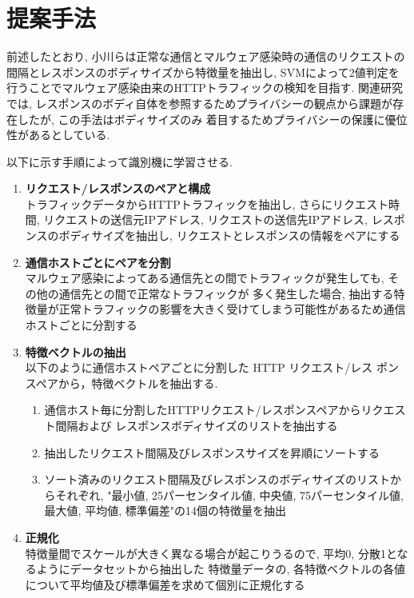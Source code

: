 \documentclass[twocolumn,10pt]{ltjsarticle}
\begin{document}
\section{提案手法}
前述したとおり, 小川らは正常な通信とマルウェア感染時の通信のリクエストの間隔とレスポンスのボディサイズから特徴量を抽出し, 
SVMによって2値判定を行うことでマルウェア感染由来のHTTPトラフィックの検知を目指す. 
関連研究では, レスポンスのボディ自体を参照するためプライバシーの観点から課題が存在したが, この手法はボディサイズのみ
着目するためプライバシーの保護に優位性があるとしている. \par
以下に示す手順によって識別機に学習させる. 

\begin{enumerate}
    \item \textbf{リクエスト/レスポンスのペアと構成}\\
    トラフィックデータからHTTPトラフィックを抽出し, さらにリクエスト時間, リクエストの送信元IPアドレス, 
    リクエストの送信先IPアドレス, レスポンスのボディサイズを抽出し, リクエストとレスポンスの情報をペアにする

    \item \textbf{通信ホストごとにペアを分割}\\
    マルウェア感染によってある通信先との間でトラフィックが発生しても, その他の通信先との間で正常なトラフィックが
    多く発生した場合, 抽出する特徴量が正常トラフィックの影響を大きく受けてしまう可能性があるため通信ホストごとに分割する

    \item \textbf{特徴ベクトルの抽出}\\
    以下のように通信ホストペアごとに分割した HTTP リクエスト/レス ポンスペアから，特徴ベクトルを抽出する. 
    \begin{enumerate}
        \item 通信ホスト毎に分割したHTTPリクエスト/レスポンスペアからリクエスト間隔および
        レスポンスボディサイズのリストを抽出する

        \item 抽出したリクエスト間隔及びレスポンスサイズを昇順にソートする

        \item ソート済みのリクエスト間隔及びレスポンスのボディサイズのリストからそれぞれ, 
        "最小値, 25パーセンタイル値, 中央値, 75パーセンタイル値, 最大値, 平均値, 標準偏差"の14個の特徴量を抽出
    \end{enumerate}

    \item \textbf{正規化}\\
    特徴量間でスケールが大きく異なる場合が起こりうるので, 平均0, 分散1となるようにデータセットから抽出した
    特徴量データの, 各特徴ベクトルの各値について平均値及び標準偏差を求めて個別に正規化する
\end{enumerate}
\end{document}
